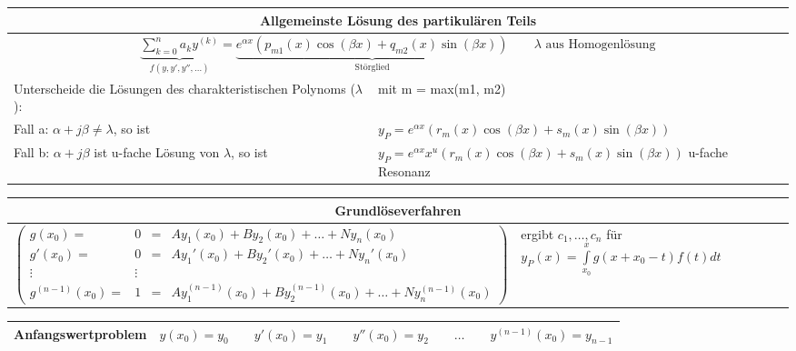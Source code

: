 \begin{table}[h!]
\begin{center}
\begin{tabularx}{\textwidth}{|p{300pt}|X|}
\hline
	\multicolumn{2}{|c|}{Allgemeinste Lösung des partikulären Teils}\\
\hline
	\multicolumn{2}{|c|}{$\underbrace{\sum_{k=0}^n a_k y^{(k)}}_{f(y,y',y'',\ldots)} = \underbrace{e^{\alpha x} (p_{m1}(x) \cos (\beta x) + q_{m2}(x) \sin (\beta x))}_{\text{Störglied}} \qquad \lambda \text{ aus Homogenlösung}$}\\
\hline
	Unterscheide die Lösungen des charakteristischen Polynoms ($\lambda$): &
	mit m = max(m1, m2)\\

	Fall a: $\alpha + j\beta \neq \lambda$, so ist &
	$y_P = e^{\alpha x}(r_m(x)\cos(\beta x) + s_m(x) \sin(\beta x))$\\
	Fall b: $\alpha + j\beta$  ist u-fache Lösung von $\lambda$, so ist &
	$y_P = e^{\alpha x} x^u (r_m(x) \cos(\beta x) + s_m(x) \sin(\beta x))$\newline
	u-fache Resonanz\\
\hline
\end{tabularx}
\begin{tabularx}{\textwidth}{|p{350pt}|X|}
\hline
	\multicolumn{2}{|c|}{Grundlöseverfahren}\\
\hline
	$\begin{pmatrix}
	g(x_0)=  & 0 & = & Ay_1(x_0)+By_2(x_0)+\ldots +Ny_n(x_0)\\
	g'(x_0)= & 0 & = & Ay_1'(x_0)+By_2'(x_0)+\ldots +Ny_n'(x_0)\\
	\vdots  & \vdots & \\                            
	g^{(n-1)}(x_0)= & 1 & = & Ay_1^{(n-1)}(x_0)+By_2^{(n-1)}(x_0)+\ldots
	+Ny_n^{(n-1)}(x_0)
	\end{pmatrix}$ &
	
	ergibt $c_1,\ldots ,c_n$ für\newline
	$y_{P}(x)=\int\limits_{x_0}^x{g(x+x_0-t)f(t)dt}$\\
\hline
\end{tabularx}

\begin{tabularx}{\textwidth}{|p{120pt}|X|}
	Anfangswertproblem&
	$y(x_0) = y_0 \qquad y'(x_0) = y_1 \qquad y''(x_0) = y_2 \qquad \dots \qquad y^{(n-1)}(x_0) = y_{n-1}$\\
\hline
\end{tabularx}


\end{center}
\end{table}
